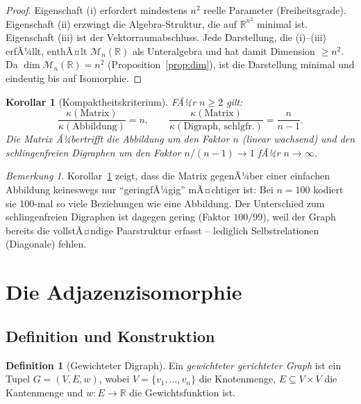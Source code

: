 ﻿\documentclass[12pt, a4paper]{article}
\newtheorem{corollary}[theorem]{Korollar}
\theoremstyle{definition}
\newtheorem{definition}[theorem]{Definition}
\theoremstyle{remark}
\newtheorem{remark}[theorem]{Bemerkung}
\newcommand{\R}{\mathbb{R}}
\begin{document}
\begin{proof}
Eigenschaft (i) erfordert mindestens $n^2$ reelle Parameter (Freiheitsgrade).
Eigenschaft (ii) erzwingt die Algebra-Struktur, die auf $\R^{n^2}$ minimal
ist. Eigenschaft (iii) ist der Vektorraumabschluss. Jede Darstellung, die
(i)--(iii) erfÃ¼llt, enthÃ¤lt $\mathcal{M}_n(\R)$ als Unteralgebra und hat
damit Dimension $\geq n^2$. Da $\dim \mathcal{M}_n(\R) = n^2$
(Proposition~\ref{prop:dim}), ist die Darstellung minimal und eindeutig
bis auf Isomorphie.
\end{proof}

\begin{corollary}[Kompaktheitskriterium]
\label{cor:krit}
FÃ¼r $n \geq 2$ gilt:
\[
  \frac{\kappa(\text{Matrix})}{\kappa(\text{Abbildung})} = n, \qquad
  \frac{\kappa(\text{Matrix})}{\kappa(\text{Digraph, schlgfr.})} = \frac{n}{n-1}.
\]
Die Matrix Ã¼bertrifft die Abbildung um den Faktor $n$ (linear wachsend)
und den schlingenfreien Digraphen um den Faktor $n/(n-1) \to 1$ fÃ¼r $n \to \infty$.
\end{corollary}

\begin{remark}
Korollar~\ref{cor:krit} zeigt, dass die Matrix gegenÃ¼ber einer einfachen
Abbildung keineswegs nur ``geringfÃ¼gig'' mÃ¤chtiger ist: Bei $n = 100$
kodiert sie 100-mal so viele Beziehungen wie eine Abbildung. Der
Unterschied zum schlingenfreien Digraphen ist dagegen gering (Faktor
$100/99$), weil der Graph bereits die vollstÃ¤ndige Paarstruktur
erfasst -- lediglich Selbstrelationen (Diagonale) fehlen.
\end{remark}

\section{Die Adjazenzisomorphie}
\label{sec:adjazenz}

\subsection{Definition und Konstruktion}
\label{subsec:adj_def}

\begin{definition}[Gewichteter Digraph]
Ein \emph{gewichteter gerichteter Graph} ist ein Tupel
$G = (V, E, w)$, wobei $V = \{v_1,\ldots,v_n\}$ die Knotenmenge,
$E \subseteq V \times V$ die Kantenmenge und $w: E \to \R$ die
Gewichtsfunktion ist.
\end{definition}
\end{document}
